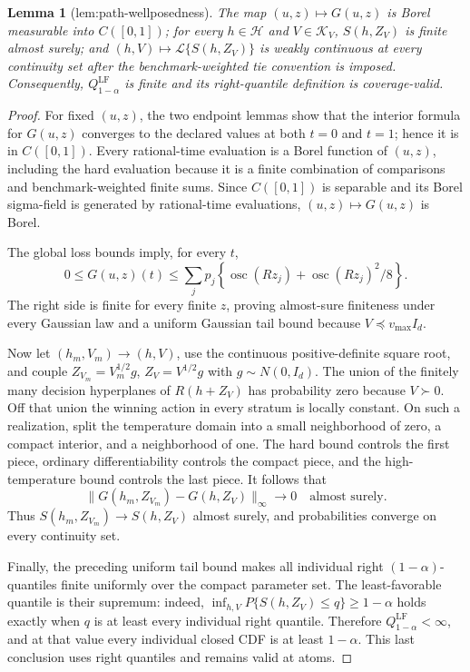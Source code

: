 \documentclass{article}
\newtheorem{lemma}{Lemma}
\begin{document}
\begin{lemma}[lem:path-wellposedness]\label{lem:path-wellposedness}
The map \((u,z)\mapsto G(u,z)\) is Borel measurable into \(C([0,1])\); for every \(h\in\mathcal H\) and \(V\in\mathcal K_V\), \(S(h,Z_V)\) is finite almost surely; and \((h,V)\mapsto\mathcal L\{S(h,Z_V)\}\) is weakly continuous at every continuity set after the benchmark-weighted tie convention is imposed. Consequently, \(Q_{1-\alpha}^{\mathrm{LF}}\) is finite and its right-quantile definition is coverage-valid.
\end{lemma}
\begin{proof}
For fixed \((u,z)\), the two endpoint lemmas show that the interior formula for \(G(u,z)\) converges to the declared values at both \(t=0\) and \(t=1\); hence it is in \(C([0,1])\).  Every rational-time evaluation is a Borel function of \((u,z)\), including the hard evaluation because it is a finite combination of comparisons and benchmark-weighted finite sums.  Since \(C([0,1])\) is separable and its Borel sigma-field is generated by rational-time evaluations, \((u,z)\mapsto G(u,z)\) is Borel.

The global loss bounds imply, for every \(t\),
\[
 0\le G(u,z)(t)\le\sum_jp_j\left\{\operatorname{osc}(Rz_j)
       +\operatorname{osc}(Rz_j)^2/8\right\}.
\]
The right side is finite for every finite \(z\), proving almost-sure finiteness under every Gaussian law and a uniform Gaussian tail bound because \(V\preceq v_{\max}I_d\).

Now let \((h_m,V_m)\to(h,V)\), use the continuous positive-definite square root, and couple \(Z_{V_m}=V_m^{1/2}g\), \(Z_V=V^{1/2}g\) with \(g\sim N(0,I_d)\).  The union of the finitely many decision hyperplanes of \(R(h+Z_V)\) has probability zero because \(V\succ0\).  Off that union the winning action in every stratum is locally constant.  On such a realization, split the temperature domain into a small neighborhood of zero, a compact interior, and a neighborhood of one.  The hard bound controls the first piece, ordinary differentiability controls the compact piece, and the high-temperature bound controls the last piece.  It follows that
\[
 \|G(h_m,Z_{V_m})-G(h,Z_V)\|_\infty\longrightarrow0
 \quad\text{almost surely}.
\]
Thus \(S(h_m,Z_{V_m})\to S(h,Z_V)\) almost surely, and probabilities converge on every continuity set.

Finally, the preceding uniform tail bound makes all individual right \((1-\alpha)\)-quantiles finite uniformly over the compact parameter set.  The least-favorable quantile is their supremum: indeed, \(\inf_{h,V}P\{S(h,Z_V)\le q\}\ge1-\alpha\) holds exactly when \(q\) is at least every individual right quantile.  Therefore \(Q_{1-\alpha}^{\mathrm{LF}}<\infty\), and at that value every individual closed CDF is at least \(1-\alpha\).  This last conclusion uses right quantiles and remains valid at atoms.
\end{proof}
\end{document}
